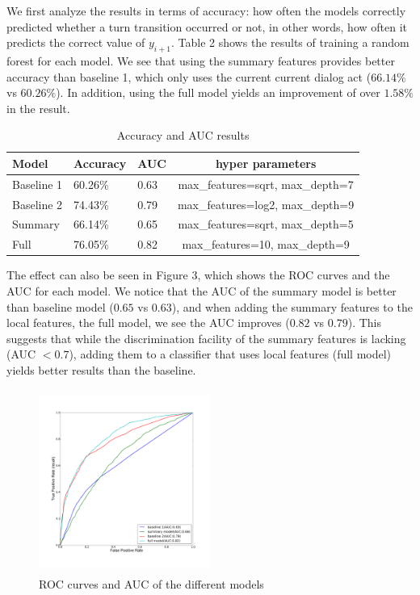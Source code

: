We first analyze the results in terms of accuracy: how often the models correctly predicted whether a turn transition occurred or not, in other words, how often it predicts the correct value of $y_{i+1}$.
%
Table 2 shows the results of training a random forest for each model.
We see that using the summary features provides better accuracy than baseline 1, which only uses the current current dialog act ($66.14\%$ vs $60.26\%$). In addition, using the full model yields an improvement of over $1.58\%$ in the result.
%
\begin{table}[ht!]
\scriptsize
   \begin{center}
    \begin{tabular}{| l | l | l | c |}
    \hline
    Model & Accuracy & AUC & hyper parameters\\
    \hline
    Baseline 1      & 60.26\% & 0.63 & \scriptsize{max\_features=sqrt, max\_depth=7} \\
    Baseline 2     & 74.43\% & 0.79 & \scriptsize{max\_features=log2, max\_depth=9}\\
    Summary        & 66.14\% & 0.65 & \scriptsize{max\_features=sqrt, max\_depth=5} \\
    Full           & 76.05\% & 0.82 &\scriptsize{ max\_features=10, max\_depth=9}\\
  \hline
\end{tabular}
\end{center}
\vspace{-1.2em}
\caption{Accuracy and AUC results }
\end{table}

The effect can also be seen in Figure 3, which shows the ROC curves and the AUC for each
model. We notice that the AUC of the summary model is better than baseline model ($0.65$ vs $0.63$), and when adding the summary features to the local features, the full model, we see the AUC improves ($0.82$ vs $0.79$). This suggests that while the discrimination facility of the summary features is lacking (AUC $<0.7$), adding them to a classifier that uses local features (full model) yields better results than the baseline.
%
 \begin{figure}[ht!]
 \centering
 \includegraphics[width=0.5\textwidth,width=6cm,height=6cm,keepaspectratio]{roc.pdf}\vspace{-1.5em}
 \caption{ROC curves and AUC of the different models \label{overflow}}
 \end{figure}

